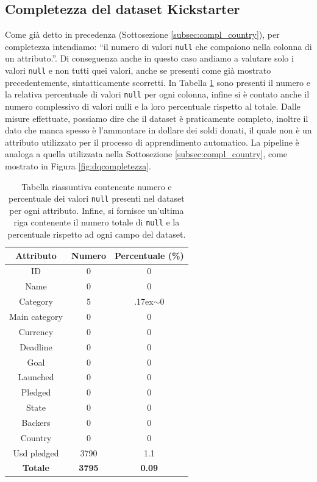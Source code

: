 \subsection{Completezza del dataset Kickstarter}
Come già detto in precedenza (Sottosezione \ref{subsec:compl_country}), per completezza intendiamo: “il numero di valori  \texttt{null} che compaiono nella colonna di un attributo.”.
Di conseguenza anche in questo caso andiamo a valutare solo i valori \texttt{null} e non tutti quei valori, anche se presenti come già mostrato precedentemente, sintatticamente scorretti.
In Tabella \ref{tab:compl_ks} sono presenti il numero e la relativa percentuale di valori \texttt{null} per ogni colonna, infine si è contato anche il numero complessivo di valori nulli e la loro percentuale rispetto al totale.
Dalle misure effettuate, possiamo dire che il dataset è praticamente completo, inoltre il dato che manca spesso è l'ammontare in dollare dei soldi donati, il quale non è un attributo utilizzato per il processo di apprendimento automatico.
La pipeline è analoga a quella utilizzata nella Sottosezione \ref{subsec:compl_country}, come mostrato in Figura \ref{fig:dqcompletezza}.
\begin{table}
	\caption{Tabella riassuntiva contenente numero e percentuale dei valori \texttt{null} presenti nel dataset per ogni attributo. Infine, si fornisce un'ultima riga contenente il numero totale di \texttt{null} e la percentuale rispetto ad ogni campo del dataset.}
	
	\label{tab:compl_ks}
	
	\centering
	\begin{tabular}{|c|c|c|}
		\hline
		\textbf{Attributo}  & \textbf{Numero} & \textbf{Percentuale (\%)} \\ 
		\hline  
		\rule{0pt}{13pt}ID & 0 & 0 \\ 
		\hline  
		\rule{0pt}{13pt}Name & 0  & 0 \\ 
		\hline  
		\rule{0pt}{13pt}Category & 5 & {\raise.17ex\hbox{$\scriptstyle\sim$}}0 \\ 
		\hline  
		\rule{0pt}{13pt}Main category & 0 & 0 \\ 
		\hline
		\rule{0pt}{13pt}Currency & 0 & 0 \\
		\hline
		\rule{0pt}{13pt}Deadline & 0 & 0 \\
		\hline
		\rule{0pt}{13pt}Goal & 0 & 0 \\
		\hline
		\rule{0pt}{13pt}Launched & 0 & 0 \\
		\hline
		\rule{0pt}{13pt}Pledged & 0 & 0 \\
		\hline
		\rule{0pt}{13pt}State & 0 & 0 \\
		\hline
		\rule{0pt}{13pt}Backers & 0 & 0\\
		\hline
		\rule{0pt}{13pt}Country & 0 & 0 \\
		\hline
		\rule{0pt}{13pt}Usd pledged & 3790 & 1.1 \\
		\hline
		\rule{0pt}{13pt}\textbf{Totale} & \textbf{3795} & \textbf{0.09} \\
		\hline
	\end{tabular}
\end{table}

